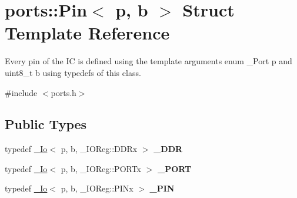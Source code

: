 \hypertarget{structports_1_1Pin}{}\section{ports\+:\+:Pin$<$ p, b $>$ Struct Template Reference}
\label{structports_1_1Pin}


Every pin of the IC is defined using the template arguments {\ttfamily enum \+\_\+\+Port p} and {\ttfamily uint8\+\_\+t b} using {\ttfamily typedef}s of this class.  




{\ttfamily \#include $<$ports.\+h$>$}

\subsection*{Public Types}
\begin{DoxyCompactItemize}
\item 
typedef \hyperlink{structports_1_1__Io}{\+\_\+\+Io}$<$ p, b, \+\_\+\+I\+O\+Reg\+::\+D\+D\+Rx $>$ {\bfseries \+\_\+\+D\+DR}\hypertarget{structports_1_1Pin_a520a470d63ee662a6e32050e23118405}{}\label{structports_1_1Pin_a520a470d63ee662a6e32050e23118405}

\item 
typedef \hyperlink{structports_1_1__Io}{\+\_\+\+Io}$<$ p, b, \+\_\+\+I\+O\+Reg\+::\+P\+O\+R\+Tx $>$ {\bfseries \+\_\+\+P\+O\+RT}\hypertarget{structports_1_1Pin_a21300f49ada5e9c43c8c7fd3c5d02bab}{}\label{structports_1_1Pin_a21300f49ada5e9c43c8c7fd3c5d02bab}

\item 
typedef \hyperlink{structports_1_1__Io}{\+\_\+\+Io}$<$ p, b, \+\_\+\+I\+O\+Reg\+::\+P\+I\+Nx $>$ {\bfseries \+\_\+\+P\+IN}\hypertarget{structports_1_1Pin_a11990dc8597439185ba300ee0bbc54e6}{}\label{structports_1_1Pin_a11990dc8597439185ba300ee0bbc54e6}

\end{DoxyCompactItemize}
